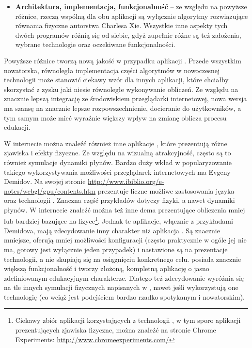 \begin{itemize}
\item \textbf{Architektura, implementacja, funkcjonalność} -- ze względu na
powyższe różnice, rzeczą wspólną dla obu aplikacji są wyłącznie algorytmy
rozwiązujące równania fizyczne autorstwa Charlesa Xie. Wszystkie inne aspekty
tych dwóch programów różnią się od siebie, gdyż zupełnie różne są też założenia,
wybrane technologie oraz oczekiwane funkcjonalności.

\end{itemize}

Powyższe różnice tworzą nową jakość w przypadku aplikacji \en \js. Przede
wszystkim nowatorska, równoległa implementacja części algorytmów w nowoczesnej
technologii  może stanowić ciekawy wzór dla innych aplikacji, które
chciałby skorzystać z zysku jaki niesie równoległe wykonywanie obliczeń. Ze
względu na znacznie lepszą integrację ze środowiskiem przeglądarki internetowej,
nowa wersja ma szansę na znacznie lepsze rozpowszechnienie, docieranie do
użytkowników, a tym samym może mieć wyraźnie większy wpływ na zmianę oblicza
procesu edukacji.

W internecie można znaleźć również inne aplikacje \js, które prezentują różne
zjawiska i efekty fizyczne. Ze względu na wizualną atrakcyjność, często są to
również symulacje dynamiki płynów. Bardzo duży wkład w popularyzowanie takiego
wykorzystywania możliwości przeglądarek internetowych ma Evgeny Demidov. Na
swojej stronie \url{http://www.ibiblio.org/e-notes/webgl/gpu/contents.htm}
prezentuje liczne możliwe zastosowania języka \js oraz technologii .
Znaczna część przykładów dotyczy fizyki, a nawet dynamiki płynów. W internecie
znaleźć można też inne dema prezentujące obliczenia mniej lub bardziej bazujące
na fizyce\footnote{Ciekawy zbiór aplikacji korzystających z technologii
, w tym sporo aplikacji prezentujących zjawiska fizyczne, można
znaleźć na stronie Chrome Experiments: \url{http://www.chromeexperiments.com/}}.
Jednak te aplikacje, włącznie z przykładami Demidova, mają zdecydowanie inny
charakter niż aplikacja \en. Są znacznie mniejsze, oferują mniej możliwości
konfiguracji (często praktycznie w ogóle jej nie ma, gotowy jest wyłącznie jeden
przypadek) i nastawione są na prezentacje technologii, a nie skupiają się na
osiągnięciu konkretnego celu. \en posiada znacznie większą funkcjonalność i
tworzy złożoną, kompletną aplikację o jasno zdefiniowanym edukacyjnym
charakterze. Dlatego też zdecydowanie wyróżnia się na tle innych symulacji
fizycznych napisanych w \js, nawet jeśli wykorzystują one technologię 
(co wciąż jest podejściem bardzo rzadko spotykanym i nowatorskim).
